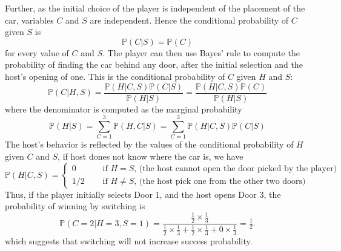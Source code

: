 Further, as the initial choice of the player is independent of the placement of the car, variables $C$ and $S$ are independent. Hence the conditional probability of $C$ given $S$ is
\begin{equation}
\mathbb{P}(C|S)= \mathbb{P}(C)
\end{equation} 
for every value of $C$ and $S$. The player can then use Bayes' rule to compute the probability of finding the car behind any door, after the initial selection and the host's opening of one. This is the conditional probability of $C$ given $H$ and $S$:
\begin{equation}
\mathbb{P}(C|H, S)= \frac{\mathbb{P}(H|C, S)\mathbb{P}(C|S)}{\mathbb{P}(H|S)} =\frac{\mathbb{P}(H|C, S)\mathbb{P}(C)}{\mathbb{P}(H|S)}
\end{equation}
where the denominator is computed as the marginal probability 
\begin{equation}
\mathbb{P}(H|S)= \sum_{C=1}^3 \mathbb{P}(H,C|S) = \sum_{C=1}^3 \mathbb{P}(H|C,S) \mathbb{P}(C|S)
\end{equation}
The host's behavior is reflected by the values of the conditional probability of $H$ given $C$ and $S$, if host dones not know where the car is, we have
\begin{equation}
\mathbb{P}(H | C, S) =\left\{
\begin{array}{cl}
0 & \quad\text { if $H = S$, (the host cannot open the door picked by the player)}\\
1/2  & \quad\text { if $H \ne S$, (the host pick one from the other two doors)}
\end{array}\right.
\end{equation}
Thus, if the player initially selects Door 1, and the host opens Door 3, the probability of winning by switching is
\begin{equation}
\mathbb{P}(C=2|H=3, S=1) = \frac{\frac 12 \times\frac 13}{\frac 12 \times \frac 13 + \frac 12 \times\frac 13 + 0 \times \frac 13}=\tfrac 12.
\end{equation}
which suggests that switching will not increase success probability. 

